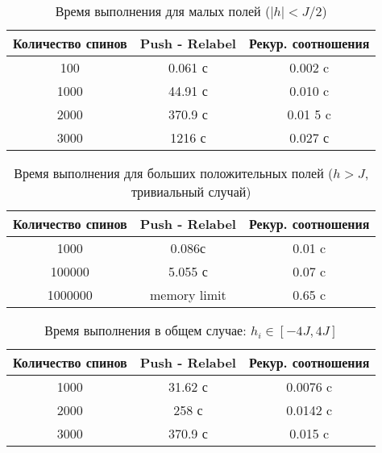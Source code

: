 \begin{table}[h!]
\centering
\begin{tabular}{ |c|c|c| } 
	\hline
	Количество спинов & Push - Relabel & Рекур. соотношения \\
	\hline
	100 & 0.061 с & 0.002 c\\
	\hline
	1000 & 44.91 с & 0.010 c \\
	\hline
	2000 & 370.9 с & 0.01	5 c \\
	\hline
	3000 & 1216 с & 0.027 с \\
	\hline
\end{tabular}
	\caption{Время выполнения для малых полей ($|h|<J/2$)}
	\label{table1}
\end{table}
\begin{table}[h!]
	\centering
	\begin{tabular}{ |c|c|c| } 
		\hline
		Количество спинов & Push - Relabel & Рекур. соотношения \\
		\hline
		1000 & 0.086с & 0.01 c\\
		\hline
		100000 & 5.055 с & 0.07 c \\
		\hline
		1000000 & memory limit & 0.65 c \\
		\hline
	\end{tabular}
	\caption{Время выполнения для больших положительных полей ($h>J$,  тривиальный случай)}
	\label{table2}
\end{table}

\begin{table}[h!]
	\centering
	\begin{tabular}{ |c|c|c| } 
		\hline
		Количество спинов & Push - Relabel & Рекур. соотношения \\
		\hline
		1000 & 31.62 с & 0.0076 c\\
		\hline
		2000 & 258 с & 0.0142 c \\
		\hline
		3000 & 370.9 с & 0.015 c \\
		\hline
	\end{tabular}
	\caption{Время выполнения в общем случае: $h_i \in [-4J, 4J]$}
	\label{table3}
\end{table}


	